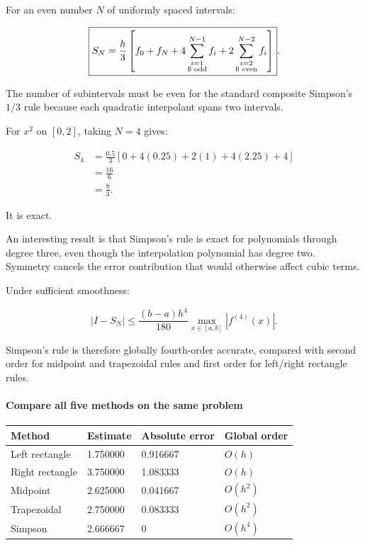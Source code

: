 \hypertarget{02-foundations-ii-ch022-composite-simpsons-rule}{}

For an even number \(N\) of uniformly spaced intervals:

\[
\boxed{ S_N= \frac h3 \left[ f_0+f_N+ 4\sum_{\substack{i=1\\\i\text{ odd}}}^{N-1}f_i+ 2\sum_{\substack{i=2\\\i\text{ even}}}^{N-2}f_i \right] }.
\]

The number of subintervals must be even for the standard composite Simpson's \(1/3\) rule because each quadratic interpolant spans two intervals.

For \(x^2\) on \([0,2]\), taking \(N=4\) gives:

\[
\begin{aligned} S_4 &=\frac{0.5}{3} [0+4(0.25)+2(1)+4(2.25)+4]\\ &=\frac{16}{6}\\ &=\boxed{\frac83}. \end{aligned}
\]

It is exact.

An interesting result is that Simpson's rule is exact for polynomials through degree three, even though the interpolation polynomial has degree two. Symmetry cancels the error contribution that would otherwise affect cubic terms.

Under sufficient smoothness:

\[
\boxed{ |I-S_N| \le \frac{(b-a)h^4}{180} \max_{x\in[a,b]}|f^{(4)}(x)| }.
\]

Simpson's rule is therefore globally fourth-order accurate, compared with second order for midpoint and trapezoidal rules and first order for left/right rectangle rules.

\paragraph{Compare all five methods on the same problem}\label{02-foundations-ii-ch022-compare-all-five-methods-on-the-same-problem}

\hypertarget{02-foundations-ii-ch022-compare-all-five-methods-on-the-same-problem}{}

{\def\LTcaptype{none} %
\begin{longtable}[]{@{}llll@{}}
\toprule\noalign{}
Method & Estimate & Absolute error & Global order \\
\midrule\noalign{}
\endhead
\bottomrule\noalign{}
\endlastfoot
Left rectangle & 1.750000 & 0.916667 & \(O(h)\) \\
Right rectangle & 3.750000 & 1.083333 & \(O(h)\) \\
Midpoint & 2.625000 & 0.041667 & \(O(h^2)\) \\
Trapezoidal & 2.750000 & 0.083333 & \(O(h^2)\) \\
Simpson & 2.666667 & 0 & \(O(h^4)\) \\
\end{longtable}
}

